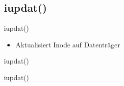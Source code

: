 \documentclass{beamer}
\begin{document}


\subsection{iupdat()}

\begin{frame}{iupdat()}
    \begin{itemize}
        \item Aktualisiert Inode auf Datenträger
    \end{itemize}
\end{frame}

\begin{frame}{iupdat()}
\end{frame}

\begin{frame}{iupdat()}
\end{frame}
\end{document}
